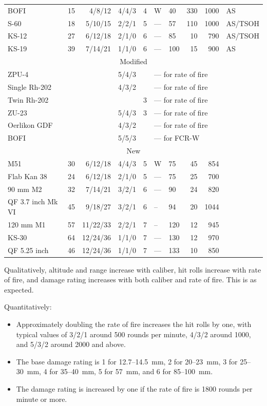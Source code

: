 {\begin{center}
\begin{tabular}{lrrllllrrl}
            BOFI&15&4/8/12&4/4/3&4&W&\phantom{0}40&330&1000&AS\\
            S-60&18&5/10/15&2/2/1&5&---&\phantom{0}57&110&1000&AS/TSOH\\
            KS-12&27&6/12/18&2/1/0&6&---&\phantom{0}85&10&790&AS/TSOH\\
            KS-19&39&7/14/21&1/1/0&6&---&100&15&900&AS\\
            \midrule
            \multicolumn{10}{c}{Modified}\\
            \midrule
            ZPU-4&&&5/4/3&&\multicolumn{5}{l}{--- for rate of fire}\\
            Single Rh-202&&&4/3/2&&\multicolumn{5}{l}{--- for rate of fire}\\
            Twin Rh-202&&&&3 &\multicolumn{5}{l}{--- for rate of fire}\\
            ZU-23&&&5/4/3&3&\multicolumn{5}{l}{--- for rate of fire}\\
            Oerlikon GDF&&&4/3/2&&\multicolumn{5}{l}{--- for rate of fire}\\
            BOFI&&&5/5/3&&\multicolumn{5}{l}{--- for FCR-W}\\
            \midrule
            \multicolumn{10}{c}{New}\\
            \midrule
            M51&30&6/12/18&4/4/3&5&W&\phantom{0}75&45&854\\
            Flab Kan 38&24&6/12/18&2/1/0&5&---&\phantom{0}75&25&700\\
            90 mm M2&32&7/14/21&3/2/1&6&---&\phantom{0}90&24&820\\
            QF 3.7 inch Mk VI&45&9/18/27&3/2/1&6&--&\phantom{0}94&20&1044\\
            120 mm M1&57&11/22/33&2/2/1&7&--&120&12&945\\
            KS-30&64&12/24/36&1/1/0&7&---&130&12&970\\
            QF 5.25 inch&46&12/24/36&1/1/0&7&---&133&10&850\\
            \bottomrule
        \end{tabular}
        \medskip
    \end{center}

    Qualitatively, altitude and range increase with caliber, hit rolls increase with rate of fire, and damage rating increases with both caliber and rate of fire.
    This is as expected.

    Quantitatively:
    \begin{itemize}
        \item Approximately doubling the rate of fire increases the hit rolls by one, with typical values of 3/2/1 around 500 rounds per minute, 4/3/2 around 1000, and 5/3/2 around 2000 and above.
        \item The base damage rating is 1 for 12.7--14.5~mm, 2 for 20--23~mm, 3 for 25--30~mm, 4 for 35--40~mm, 5 for 57~mm, and 6 for 85--100~mm.
        \item The damage rating is increased by one if the rate of fire is 1800 rounds per minute or more.
    \end{itemize}

}
